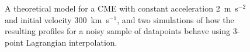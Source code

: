 \documentclass[structabstract]{aa}
\begin{document}
\begin{figure}[ht]
\caption{A theoretical model for a CME with constant acceleration 2~m~s$^{-2}$ and initial velocity 300~km~s$^{-1}$, and two simulations of how the resulting profiles for a noisy sample of datapoints behave using 3-point Lagrangian interpolation.}
\label{sim_vels_thesis}
\end{figure}
\end{document}
